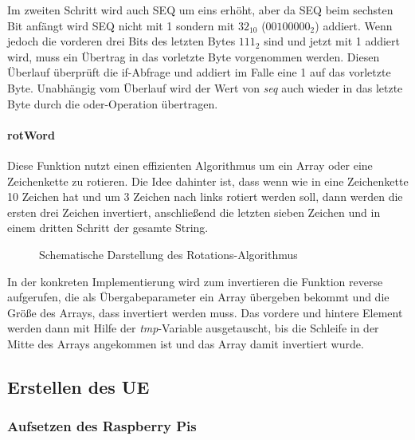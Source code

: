 		Im zweiten Schritt wird auch SEQ um eins erhöht, aber da SEQ beim sechsten Bit anfängt wird SEQ nicht mit
		1 sondern mit $32_{10}$ ($00100000_2$) addiert. Wenn jedoch die vorderen drei Bits des letzten Bytes $111_2$ sind
		und jetzt mit 1 addiert wird, muss ein Übertrag in das vorletzte Byte vorgenommen werden. Diesen Überlauf
		überprüft die if-Abfrage und addiert im Falle eine 1 auf das vorletzte Byte. Unabhängig vom Überlauf wird
		der Wert von \emph{seq} auch wieder in das letzte Byte durch die oder-Operation übertragen.

		\paragraph{rotWord}
		Diese Funktion nutzt einen effizienten Algorithmus um ein Array oder eine Zeichenkette zu rotieren. Die
		Idee dahinter ist, dass	wenn wie in  eine Zeichenkette 10 Zeichen hat und um 3 Zeichen
		nach links rotiert werden soll, dann werden die ersten drei Zeichen invertiert, anschließend die letzten
		sieben Zeichen und in einem dritten Schritt der gesamte String.
		\begin{figure}[htp]
			\begin{center}
			\end{center}
			\caption{Schematische Darstellung des Rotations-Algorithmus}
			\label{fig:rotWord}
		\end{figure}
		
		In der konkreten Implementierung wird zum invertieren die Funktion reverse aufgerufen, die als
		Übergabeparameter ein Array übergeben bekommt und die Größe des Arrays, dass invertiert werden muss.
		Das vordere und hintere Element werden dann mit Hilfe der \emph{tmp}-Variable ausgetauscht, bis die Schleife
		in der Mitte des Arrays angekommen ist und das Array damit invertiert wurde.

	\subsection{Erstellen des UE}
		\subsubsection{Aufsetzen des Raspberry Pis}
        \label{subsubsec:installpi}
